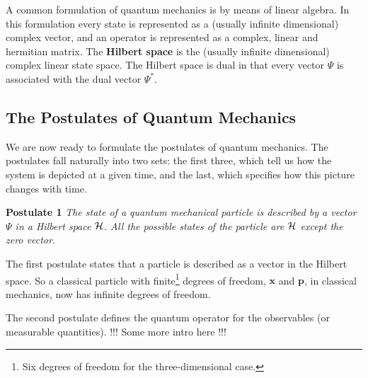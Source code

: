 A common formulation of quantum mechanics is by means of linear
algebra. In this formulation every state is represented as a (usually
infinite dimensional) complex vector, and an operator is represented
as a complex, linear and hermitian matrix. 
The {\bf Hilbert space} is the (usually infinite dimensional) complex
linear state space. The Hilbert space is dual in that every vector
$\Psi$ is associated with the dual vector $\Psi^*$.



\subsection{The Postulates of Quantum Mechanics}

We are now ready to formulate the postulates of quantum mechanics. The
postulates fall naturally into two sets: the first three, which tell
us how the system is depicted at a given time, and the last, which
specifies how this picture changes with time. 
\newline


{\bf \large Postulate 1}
\emph{
The state of a quantum mechanical particle is described by a vector
$\Psi$ in a Hilbert space ${\cal H}$. All the possible states of the
particle are ${\cal H}$ except the zero vector.
\newline
}

The first postulate states that a particle is described as a vector in
the Hilbert space. So a classical particle with finite\footnote{Six
  degrees of freedom for the three-dimensional case.} degrees of
freedom, $\mathbf{x}$ and $\mathbf{p}$, in classical
mechanics, now has infinite degrees of freedom. 
\newline


The second postulate defines the quantum operator for the observables
(or measurable quantities). !!! Some more intro here !!!
\newline

